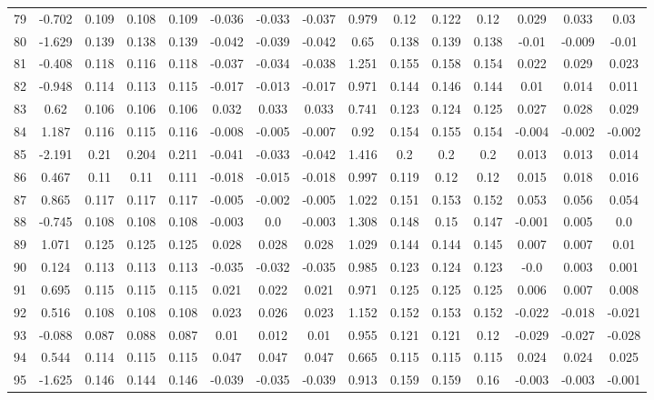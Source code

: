 \begin{table}[H]
{\begin{tabular}{l|c|ccc|ccc|c|ccc|ccc}
			79 & -0.702 & 0.109 & 0.108 & 0.109 & -0.036 & -0.033 & -0.037 & 0.979 & 0.12 & 0.122 & 0.12 & 0.029 & 0.033 & 0.03 \\
			80 & -1.629 & 0.139 & 0.138 & 0.139 & -0.042 & -0.039 & -0.042 & 0.65 & 0.138 & 0.139 & 0.138 & -0.01 & -0.009 & -0.01 \\
			81 & -0.408 & 0.118 & 0.116 & 0.118 & -0.037 & -0.034 & -0.038 & 1.251 & 0.155 & 0.158 & 0.154 & 0.022 & 0.029 & 0.023 \\
			82 & -0.948 & 0.114 & 0.113 & 0.115 & -0.017 & -0.013 & -0.017 & 0.971 & 0.144 & 0.146 & 0.144 & 0.01 & 0.014 & 0.011 \\
			83 & 0.62 & 0.106 & 0.106 & 0.106 & 0.032 & 0.033 & 0.033 & 0.741 & 0.123 & 0.124 & 0.125 & 0.027 & 0.028 & 0.029 \\
			84 & 1.187 & 0.116 & 0.115 & 0.116 & -0.008 & -0.005 & -0.007 & 0.92 & 0.154 & 0.155 & 0.154 & -0.004 & -0.002 & -0.002 \\
			85 & -2.191 & 0.21 & 0.204 & 0.211 & -0.041 & -0.033 & -0.042 & 1.416 & 0.2 & 0.2 & 0.2 & 0.013 & 0.013 & 0.014 \\
			86 & 0.467 & 0.11 & 0.11 & 0.111 & -0.018 & -0.015 & -0.018 & 0.997 & 0.119 & 0.12 & 0.12 & 0.015 & 0.018 & 0.016 \\
			87 & 0.865 & 0.117 & 0.117 & 0.117 & -0.005 & -0.002 & -0.005 & 1.022 & 0.151 & 0.153 & 0.152 & 0.053 & 0.056 & 0.054 \\
			88 & -0.745 & 0.108 & 0.108 & 0.108 & -0.003 & 0.0 & -0.003 & 1.308 & 0.148 & 0.15 & 0.147 & -0.001 & 0.005 & 0.0 \\
			89 & 1.071 & 0.125 & 0.125 & 0.125 & 0.028 & 0.028 & 0.028 & 1.029 & 0.144 & 0.144 & 0.145 & 0.007 & 0.007 & 0.01 \\
			90 & 0.124 & 0.113 & 0.113 & 0.113 & -0.035 & -0.032 & -0.035 & 0.985 & 0.123 & 0.124 & 0.123 & -0.0 & 0.003 & 0.001 \\
			91 & 0.695 & 0.115 & 0.115 & 0.115 & 0.021 & 0.022 & 0.021 & 0.971 & 0.125 & 0.125 & 0.125 & 0.006 & 0.007 & 0.008 \\
			92 & 0.516 & 0.108 & 0.108 & 0.108 & 0.023 & 0.026 & 0.023 & 1.152 & 0.152 & 0.153 & 0.152 & -0.022 & -0.018 & -0.021 \\
			93 & -0.088 & 0.087 & 0.088 & 0.087 & 0.01 & 0.012 & 0.01 & 0.955 & 0.121 & 0.121 & 0.12 & -0.029 & -0.027 & -0.028 \\
			94 & 0.544 & 0.114 & 0.115 & 0.115 & 0.047 & 0.047 & 0.047 & 0.665 & 0.115 & 0.115 & 0.115 & 0.024 & 0.024 & 0.025 \\
			95 & -1.625 & 0.146 & 0.144 & 0.146 & -0.039 & -0.035 & -0.039 & 0.913 & 0.159 & 0.159 & 0.16 & -0.003 & -0.003 & -0.001 \\

\end{tabular}}
\end{table}
